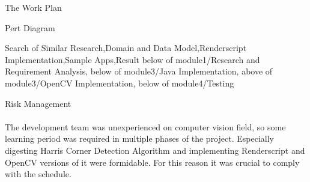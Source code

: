 \documentclass[12pt, a4paper]{article} \pagenumbering{gobble}
\begin{document}
\begin{section}{The Work Plan}
\begin{landscape}
\begin{subsection}{Pert Diagram}
\begin{center}
{  Search of Similar Research,Domain and Data Model,Renderscript Implementation,Sample Apps,Result%
  }{%
  below of module1/Research and Requirement Analysis, below of module3/Java Implementation,
  above of module3/OpenCV Implementation, below of module4/Testing%
  }
  \smartdiagramconnect{{]-latex’}}{additional-module1/module2}
  \smartdiagramconnect{{]-latex’}}{additional-module2/module4}
  \smartdiagramconnect{{]-latex’}}{additional-module3/module4}
  \smartdiagramconnect{{]-latex’}}{additional-module4/module4}
  \end{center}
\end{subsection}
\end{landscape}
\newpage
\begin{subsection}{Risk Management}
  \paragraph{}{%
  The development team was unexperienced on computer vision field, so some learning
  period was required in multiple phases of the project. Especially digesting Harris Corner Detection Algorithm
  and implementing Renderscript and OpenCV versions of it were formidable.
  For this reason it was crucial to comply with the schedule.\\
  }
\end{subsection}
\end{section}

\newpage
\end{document}
